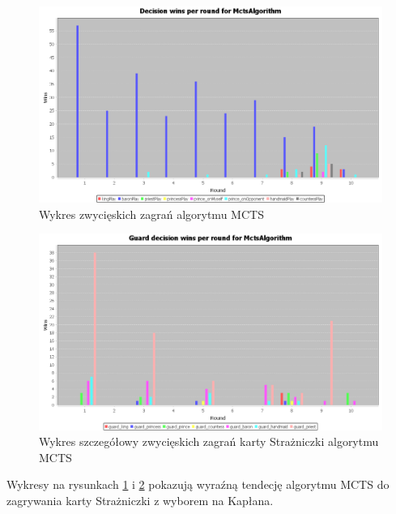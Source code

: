 \begin{figure}[H]
	\centering
	\includegraphics[width=\textwidth]{Resources/MctsVsR/MctsVsRdecision.PNG}
	\caption{Wykres zwycięskich zagrań algorytmu MCTS} 
	\label{fig:MctsVsRdecision}
\end{figure} 

\begin{figure}[H]
	\centering
	\includegraphics[width=\textwidth]{Resources/MctsVsR/MctsVsRguarddecision.PNG}
	\caption{Wykres szczegółowy zwycięskich zagrań karty Strażniczki algorytmu MCTS} 
	\label{fig:MctsVsRguarddecision}
\end{figure}

Wykresy na rysunkach \ref{fig:MctsVsRdecision} i \ref{fig:MctsVsRguarddecision} pokazują wyraźną tendecję algorytmu MCTS do zagrywania karty Strażniczki z wyborem na Kapłana.

\clearpage
